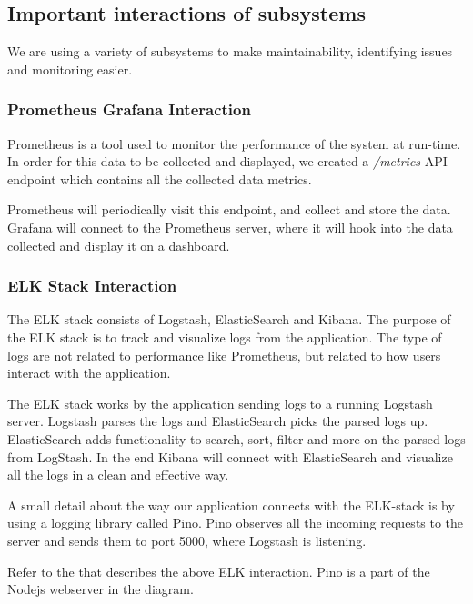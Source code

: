 \documentclass{article}
\begin{document}
\subsection{Important interactions of subsystems}
    
We are using a variety of subsystems to make maintainability, identifying issues and monitoring easier.
\subsubsection{Prometheus Grafana Interaction} 
Prometheus is a tool used to monitor the performance of the system at run-time. In order for this data to be collected and displayed, we created a \textit{/metrics} API endpoint which contains all the collected data metrics.

Prometheus will periodically visit this endpoint, and collect and store the data. Grafana will connect to the Prometheus server, where it will hook into the data collected and display it on a dashboard.

\subsubsection{ELK Stack Interaction}
\label{ELK Stack Interaction}
The ELK stack consists of Logstash, ElasticSearch and Kibana. The purpose of the ELK stack is to track and visualize logs from the application. The type of logs are not related to performance like Prometheus, but related to how users interact with the application.

The ELK stack works by the application sending logs to a running Logstash server. Logstash parses the logs and ElasticSearch picks the parsed logs up. ElasticSearch adds functionality to search, sort, filter and more on the parsed logs from LogStash. In the end Kibana will connect with ElasticSearch and visualize all the logs in a clean and effective way.

A small detail about the way our application connects with the ELK-stack is by using a logging library called Pino. Pino observes all the incoming requests to the server and sends them to port 5000, where Logstash is listening. 


Refer to the  that describes the above ELK interaction. Pino is a part of the Nodejs webserver in the diagram.
\end{document}
